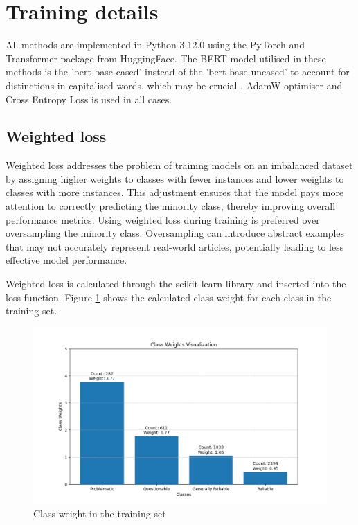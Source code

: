 \section{Training details}

All methods are implemented in Python 3.12.0 \cite{van-1995-python} using the PyTorch \cite{paszke-2017-pytorch} and Transformer \cite{wolf-2020-huggingface} package from HuggingFace. The BERT model utilised in these methods is the 'bert-base-cased' instead of the 'bert-base-uncased' to account for distinctions in capitalised words, which may be crucial \cite{devlin-2019-bert}. AdamW \cite{loshchilov-2019-adamw} optimiser and Cross Entropy Loss is used in all cases.

\subsection{Weighted loss}

Weighted loss addresses the problem of training models on an imbalanced dataset by assigning higher weights to classes with fewer instances and lower weights to classes with more instances. This adjustment ensures that the model pays more attention to correctly predicting the minority class, thereby improving overall performance metrics. Using weighted loss during training is preferred over oversampling the minority class. Oversampling can introduce abstract examples that may not accurately represent real-world articles, potentially leading to less effective model performance.

Weighted loss is calculated through the scikit-learn library \cite{pedregosa-2011-scikit-learn} and inserted into the loss function. Figure \ref{fig:class_weight} shows the calculated class weight for each class in the training set.


\begin{figure}[htbp]
    \centering
    \includegraphics[width=0.9\linewidth]{figures/class_weight.png}
    \caption{Class weight in the training set}
    \label{fig:class_weight}
\end{figure}



